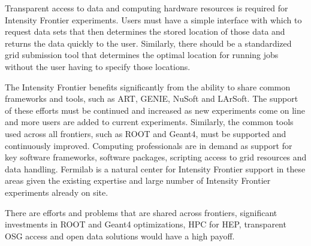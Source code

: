 Transparent access to data and computing hardware resources is required for Intensity Frontier
experiments.   Users must have a simple interface with which to request data
sets that then determines the stored location of those data and returns the
data quickly to the user.  Similarly, there should be a standardized grid
submission tool that determines the optimal location for running jobs without
the user having to specify those locations.

The Intensity Frontier benefits significantly from the ability to share common frameworks and
tools, such as ART, GENIE, NuSoft and LArSoft.  The support of these efforts
must be continued and increased as new experiments come on line and more users
are added to current experiments.  Similarly, the common tools used across all
frontiers, such as ROOT and Geant4, must be supported and continuously
improved. Computing professionals are in demand as support for key software
frameworks, software packages, scripting access to grid resources and data
handling. Fermilab is a natural center for Intensity Frontier support in these areas given the
existing expertise and large number of Intensity Frontier experiments already on site.

There are efforts and problems that are shared across frontiers, significant
investments in ROOT and Geant4 optimizations, HPC for HEP, transparent OSG
access and open data solutions would have a high payoff.


